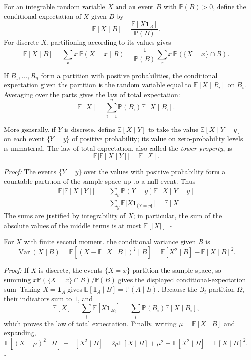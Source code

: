 \documentclass[a4paper,11pt,abstracton]{scrartcl}
\theoremstyle{dotlessP}
\theoremstyle{dotlessS}
\theoremstyle{remark}
\theoremstyle{definition}
\begin{document}
For an integrable random variable $X$ and an event $B$ with $\mathbb{P}(B)>0$, define the conditional expectation of $X$ given $B$ by
\[
  \mathbb{E}[X\mid B]=\frac{\mathbb{E}[X\mathbf{1}_B]}{\mathbb{P}(B)}.
\]
For discrete $X$, partitioning according to its values gives
\[
  \mathbb{E}[X\mid B]=\sum_x x\,\mathbb{P}(X=x\mid B)
  =\frac{1}{\mathbb{P}(B)}\sum_x x\,\mathbb{P}(\{X=x\}\cap B).
\]

If $B_1,\ldots,B_n$ form a partition with positive probabilities, the conditional expectation given the partition is the random variable equal to $\mathbb{E}[X\mid B_i]$ on $B_i$. Averaging over the parts gives the law of total expectation:
\[
  \mathbb{E}[X]=\sum_{i=1}^{n}\mathbb{P}(B_i)\mathbb{E}[X\mid B_i].
\]

More generally, if $Y$ is discrete, define $\mathbb{E}[X\mid Y]$ to take the value $\mathbb{E}[X\mid Y=y]$ on each event $\{Y=y\}$ of positive probability; its value on zero-probability levels is immaterial. The law of total expectation, also called the \emph{tower property}, is
\[
  \mathbb{E}\bigl[\mathbb{E}[X\mid Y]\bigr]=\mathbb{E}[X].
\]

\begin{claim_box}
\textit{Proof:} The events $\{Y=y\}$ over the values with positive probability form a countable partition of the sample space up to a null event. Thus
\[
\begin{aligned}
  \mathbb{E}\bigl[\mathbb{E}[X\mid Y]\bigr]
  &=\sum_y\mathbb{P}(Y=y)\mathbb{E}[X\mid Y=y]\\
  &=\sum_y\mathbb{E}\bigl[X\mathbf{1}_{\{Y=y\}}\bigr]
  =\mathbb{E}[X].
\end{aligned}
\]
The sums are justified by integrability of $X$; in particular, the sum of the absolute values of the middle terms is at most $\mathbb{E}[|X|]$.
\hfill$\square$
\end{claim_box}

For $X$ with finite second moment, the conditional variance given $B$ is
\[
  \operatorname{Var}(X\mid B)
  =\mathbb{E}\!\left[(X-\mathbb{E}[X\mid B])^2\mid B\right]
  =\mathbb{E}[X^2\mid B]-\mathbb{E}[X\mid B]^2.
\]

\begin{claim_box}
\textit{Proof:} If $X$ is discrete, the events $\{X=x\}$ partition the sample space, so summing $x\mathbb{P}(\{X=x\}\cap B)/\mathbb{P}(B)$ gives the displayed conditional-expectation sum. Taking $X=\mathbf{1}_A$ gives $\mathbb{E}[\mathbf{1}_A\mid B]=\mathbb{P}(A\mid B)$.
Because the $B_i$ partition $\Omega$, their indicators sum to $1$, and
\[
  \mathbb{E}[X]=\sum_i\mathbb{E}[X\mathbf{1}_{B_i}]
  =\sum_i\mathbb{P}(B_i)\mathbb{E}[X\mid B_i],
\]
which proves the law of total expectation. Finally, writing $\mu=\mathbb{E}[X\mid B]$ and expanding,
\[
  \mathbb{E}[(X-\mu)^2\mid B]
  =\mathbb{E}[X^2\mid B]-2\mu\mathbb{E}[X\mid B]+\mu^2
  =\mathbb{E}[X^2\mid B]-\mathbb{E}[X\mid B]^2.
\]
\hfill$\square$
\end{claim_box}
\end{document}
